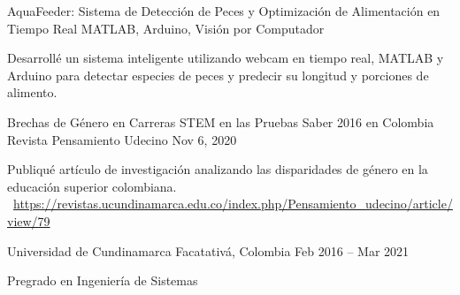 \documentclass[]{awesome-cv}
\begin{document}
\vspace{-2mm}
\begin{cventries}
	\vspace{-1mm}
	\cventry
	{}
	{AquaFeeder: Sistema de Detección de Peces y Optimización de Alimentación en Tiempo Real \vspace{-5mm}}
	{MATLAB, Arduino, Visión por Computador \vspace{-5mm}}
	{}
	{\begin{cvsectionnormaltext}
		\item{Desarrollé un sistema inteligente utilizando webcam en tiempo real, MATLAB y Arduino para detectar especies de peces y predecir su longitud y porciones de alimento.}
	\end{cvsectionnormaltext}}
	
	\vspace{-4mm}
	\cventry
	{}
	{Brechas de Género en Carreras STEM en las Pruebas Saber 2016 en Colombia \vspace{-5mm}}
	{Revista Pensamiento Udecino \vspace{-5mm}}
	{Nov 6, 2020 \vspace{-5mm}}
	{\begin{cvsectionnormaltext}
		\item{Publiqué artículo de investigación analizando las disparidades de género en la educación superior colombiana.
		\newline \faLink\ \href{https://revistas.ucundinamarca.edu.co/index.php/Pensamiento_udecino/article/view/79}{https://revistas.ucundinamarca.edu.co/index.php/Pensamiento\_udecino/article/view/79}}
	\end{cvsectionnormaltext}}
	
	\vspace{-6mm}
	
\end{cventries}

\vspace{1mm}
\begin{cventries}
	\vspace{-3mm}
	\cventry
	{}
	{Universidad de Cundinamarca \vspace{-5mm}}
	{Facatativá, Colombia \vspace{-5mm}}
	{Feb 2016 – Mar 2021 \vspace{-5mm}}
	{\begin{cvsectionnormaltext} 
		\item{Pregrado en Ingeniería de Sistemas}
	\end{cvsectionnormaltext}}
\end{cventries}
\end{document}
